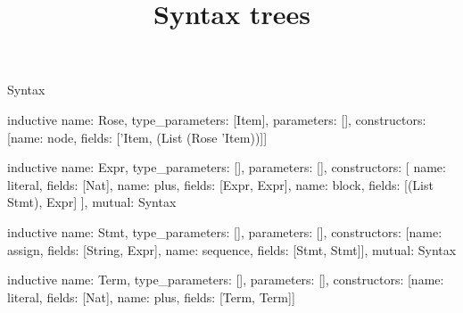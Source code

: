 \begin{lexlean}{Syntax}
\title{Syntax trees}
\begin{semanticmodule}
inductive{
  name: Rose,
  type_parameters: [Item],
  parameters: [],
  constructors: [{name: node, fields: ['Item, (List (Rose 'Item))]}]
}

inductive{
  name: Expr,
  type_parameters: [],
  parameters: [],
  constructors: [
    {name: literal, fields: [Nat]},
    {name: plus, fields: [Expr, Expr]},
    {name: block, fields: [(List Stmt), Expr]}
  ],
  mutual: Syntax
}

inductive{
  name: Stmt,
  type_parameters: [],
  parameters: [],
  constructors: [{name: assign, fields: [String, Expr]}, {name: sequence, fields: [Stmt, Stmt]}],
  mutual: Syntax
}

inductive{
  name: Term,
  type_parameters: [],
  parameters: [],
  constructors: [{name: literal, fields: [Nat]}, {name: plus, fields: [Term, Term]}]
}
\end{semanticmodule}
\end{lexlean}
